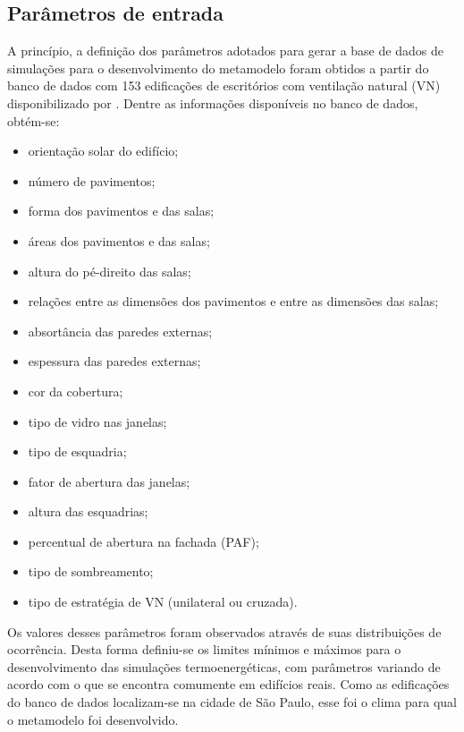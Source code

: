 \documentclass[brazil,hardcopy,openany,a5paper]{ufscthesis}
\begin{document}
		\subsection{Parâmetros de entrada}\label{subsec:par}
		
		A princípio, a definição dos parâmetros adotados para gerar a base de dados de simulações para o desenvolvimento do metamodelo foram obtidos a partir do banco de dados com 153 edificações de escritórios com ventilação natural (VN) disponibilizado por  \cite{Pereira2018}.  		
		Dentre as informações  disponíveis no banco de dados, obtém-se:

		\begin{itemize}
			\item orientação solar do edifício;
			\item número de pavimentos;
			\item forma dos pavimentos e das salas;
			\item áreas dos pavimentos e das salas;
			\item altura do pé-direito das salas;
			\item relações entre as dimensões dos pavimentos e entre as dimensões das salas;
			\item absortância das paredes externas; %
			\item espessura das paredes externas;
			\item cor da cobertura;
			\item tipo de vidro nas janelas;
			\item tipo de esquadria;
			\item fator de abertura das janelas;
			\item altura das esquadrias;
			\item percentual de abertura na fachada (PAF);  %
			\item tipo de sombreamento;  %
			\item tipo de estratégia de VN (unilateral ou cruzada).
		\end{itemize} 
		
		Os valores desses parâmetros foram observados através de suas distribuições de ocorrência. Desta forma definiu-se os limites mínimos e máximos para o desenvolvimento das simulações termoenergéticas, com parâmetros variando de acordo com o que se encontra comumente em edifícios reais. Como as edificações do banco de dados localizam-se na cidade de São Paulo, esse foi o clima para qual o metamodelo foi desenvolvido.
		
\end{document}
